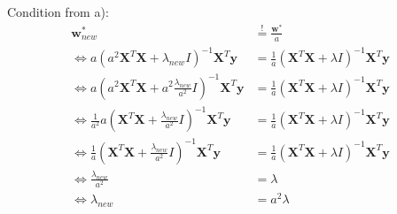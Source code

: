 Condition from a):
\begin{align*}
\mathbf{w}^*_{new} &\overset{!}{=} \frac{\mathbf{w}^*}{a} \\
\Leftrightarrow  a (a^2 \mathbf{X}^T \mathbf{X} + \lambda_{new} I)^{-1} \mathbf{X}^T \mathbf{y} &= \frac{1}{a}(\mathbf{X}^T \mathbf{X} + \lambda I)^{-1} \mathbf{X}^T \mathbf{y} \\
\Leftrightarrow  a (a^2 \mathbf{X}^T \mathbf{X} + a^2 \frac{\lambda_{new}}{a^2} I)^{-1} \mathbf{X}^T \mathbf{y} &= \frac{1}{a}(\mathbf{X}^T \mathbf{X} + \lambda I)^{-1} \mathbf{X}^T \mathbf{y} \\
\Leftrightarrow  \frac{1}{a^2} a (\mathbf{X}^T \mathbf{X} + \frac{\lambda_{new}}{a^2} I)^{-1} \mathbf{X}^T \mathbf{y} &= \frac{1}{a}(\mathbf{X}^T \mathbf{X} + \lambda I)^{-1} \mathbf{X}^T \mathbf{y} \\
\Leftrightarrow  \frac{1}{a} (\mathbf{X}^T \mathbf{X} + \frac{\lambda_{new}}{a^2} I)^{-1} \mathbf{X}^T \mathbf{y} &= \frac{1}{a}(\mathbf{X}^T \mathbf{X} + \lambda I)^{-1} \mathbf{X}^T \mathbf{y} \\
\Leftrightarrow  \frac{\lambda_{new}}{a^2} &= \lambda \\
\Leftrightarrow  \lambda_{new} &= a^2 \lambda
\end{align*}
\begin{flushleft}

\end{flushleft}
%
%
%

%



